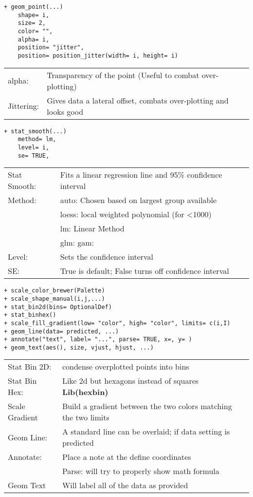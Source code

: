 \documentclass[]{article}
\begin{document}
\begin{verbatim}
+ geom_point(...)
	shape= i,
	size= 2,
	color= "",
	alpha= i,
	position= "jitter",
	position= position_jitter(width= i, height= i)
\end{verbatim}
\begin{tabular}{l l}
	alpha: & Transparency of the point (Useful to combat over-plotting) \\
	Jittering: & Gives data a lateral offset, combats over-plotting and looks good \\
\end{tabular}

\begin{verbatim}
+ stat_smooth(...)
	method= lm,
	level= i,
	se= TRUE,
\end{verbatim}
\begin{tabular}{l l}
	Stat Smooth: & Fits a linear regression line and 95\% confidence interval \\
	Method: & auto: Chosen based on largest group available \\
		& loess: local weighted polynomial (for <1000) \\
		& lm: Linear Method \\
		& glm: gam:  \\
	Level: & Sets the confidence interval \\
	SE: & True is default; False turns off confidence interval \\
\end{tabular}

\begin{verbatim}
+ scale_color_brewer(Palette)
+ scale_shape_manual(i,j,...)
+ stat_bin2d(bins= OptionalDef)
+ stat_binhex()
+ scale_fill_gradient(low= "color", high= "color", limits= c(i,I)
+ geom_line(data= predicted, ...)
+ annotate("text", label= "...", parse= TRUE, x=, y= )
+ geom_text(aes(), size, vjust, hjust, ...)
\end{verbatim}
\begin{tabular}{l l}
	Stat Bin 2D: & condense overplotted points into bins \\
	Stat Bin Hex: & Like 2d but hexagons instead of squares \textbf{Lib(hexbin)} \\
	Scale Gradient & Build a gradient between the two colors matching the two limits \\
	Geom Line: & A standard line can be overlaid; if data setting is predicted \\
	Annotate: & Place a note at the define coordinates \\
		& Parse: will try to properly show math formula \\
	Geom Text & Will label all of the data as provided \\
\end{tabular}
\end{document}
